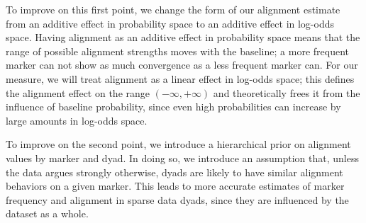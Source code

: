 \documentclass{acm_proc_article-sp}
\begin{document}
To improve on this first point, we change the form of our alignment estimate from an additive effect in probability space to an additive effect in log-odds space. Having alignment as an additive effect in probability space means that the range of possible alignment strengths moves with the baseline; a more frequent marker can not show as much convergence as a less frequent marker can.  For our measure, we will treat alignment as a linear effect in log-odds space; this defines the alignment effect on the range $(-\infty,+\infty)$ and theoretically frees it from the influence of baseline probability, since even high probabilities can increase by large amounts in log-odds space.

To improve on the second point, we introduce a hierarchical prior on alignment values by marker and dyad. In doing so, we introduce an assumption that, unless the data argues strongly otherwise, dyads are likely to have similar alignment behaviors on a given marker. This leads to more accurate estimates of marker frequency and alignment in sparse data dyads, since they are influenced by the dataset as a whole.  




\end{document}
